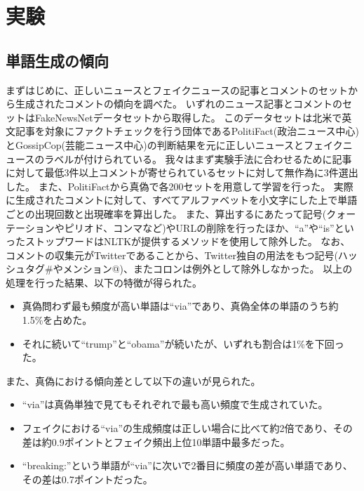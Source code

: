 \section{実験}
\subsection{単語生成の傾向}
\label{subsec:trend}
まずはじめに、正しいニュースとフェイクニュースの記事とコメントのセットから生成されたコメントの傾向を調べた。
いずれのニュース記事とコメントのセットはFakeNewsNetデータセット\cite{Shu2018FakeNewsNetAD}から取得した。
このデータセットは北米で英文記事を対象にファクトチェックを行う団体であるPolitiFact(政治ニュース中心)とGossipCop(芸能ニュース中心)の判断結果を元に正しいニュースとフェイクニュースのラベルが付けられている。
我々はまず実験手法に合わせるために記事に対して最低3件以上コメントが寄せられているセットに対して無作為に3件選出した。
また、PolitiFactから真偽で各200セットを用意して学習を行った。
実際に生成されたコメントに対して、すべてアルファベットを小文字にした上で単語ごとの出現回数と出現確率を算出した。
また、算出するにあたって記号(クォーテーションやピリオド、コンマなど)やURLの削除を行ったほか、``a''や``is''といったストップワードはNLTK\cite{bird-loper-2004-nltk}が提供するメソッドを使用して除外した。
なお、コメントの収集元がTwitterであることから、Twitter独自の用法をもつ記号(ハッシュタグ\#やメンション@)、またコロンは例外として除外しなかった。
以上の処理を行った結果、以下の特徴が得られた。

\begin{itemize}
    \item 真偽問わず最も頻度が高い単語は``via''であり、真偽全体の単語のうち約1.5\%を占めた。
    \item それに続いて``trump''と``obama''が続いたが、いずれも割合は1\%を下回った。
\end{itemize}

また、真偽における傾向差として以下の違いが見られた。

\begin{itemize}
    \item ``via''は真偽単独で見てもそれぞれで最も高い頻度で生成されていた。
    \item フェイクにおける``via''の生成頻度は正しい場合に比べて約2倍であり、その差は約0.9ポイントとフェイク頻出上位10単語中最多だった。
    \item ``breaking:''という単語が``via''に次いで2番目に頻度の差が高い単語であり、その差は0.7ポイントだった。
\end{itemize}

